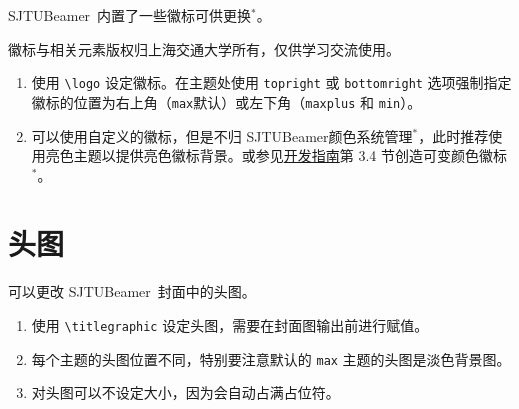 \documentclass[
    UTF8,
    heading=true,
    12pt,
    a4paper
]{ctexrep}
\newenvironment{commentlist}{\begin{enumerate}\small}{\end{enumerate}}
\def\themename{\textsf{SJTUBeamer}}
\begin{document}
\themename\ 内置了一些徽标可供更换$^*$。

\faInfoCircle 徽标与相关元素版权归上海交通大学所有，仅供学习交流使用。

\begin{tcbitemize}[raster rows=2, raster columns=3, raster every box/.style={center title, valign=center, halign=center,fonttitle=\ttfamily,colback=white}]
  \tcbitem[raster multicolumn=2,blankest]
  \begin{tcbitemize}[raster columns=2]
    \tcbitem[title={\textbackslash{}cnlogo}] \moveleft 0.3cm\hbox{\resizebox{!}{1cm}{\cnlogo}}
    \tcbitem[title={\textbackslash{}enlogo}] \moveleft 0.3cm\hbox{\resizebox{!}{1cm}{\enlogo}}
    \tcbitem[title={\textbackslash{}sjtubadge},height=3.5cm] \resizebox{!}{2cm}{\sjtubadge\ }
    \tcbitem[title={\textbackslash{}dlogo},height=3.5cm] \resizebox{3cm}{!}{\dlogo\ }
  \end{tcbitemize}
  \tcbitem[title={\textbackslash{}vlogo}] \resizebox{!}{4.8cm}{\vlogo\ }
\end{tcbitemize}


\begin{commentlist}
  \item 使用 \texttt{\textbackslash{}logo} 设定徽标。在主题处使用 \verb"topright" 或 \verb"bottomright" 选项强制指定徽标的位置为右上角（\verb"max"默认）或左下角（\verb"maxplus" 和 \verb"min"）。
  \item 可以使用自定义的徽标，但是不归 \themename 颜色系统管理$^*$，此时推荐使用亮色主题以提供亮色徽标背景。或参见\href{run:sjtubeamerdevguide.pdf}{开发指南}第 3.4 节创造可变颜色徽标$^*$。
\end{commentlist}

\chapter{头图}

可以更改 \themename\ 封面中的头图。


\begin{commentlist}
  \item 使用 \texttt{\textbackslash{}titlegraphic} 设定头图，需要在封面图输出前进行赋值。
  \item 每个主题的头图位置不同，特别要注意默认的 \texttt{max} 主题的头图是淡色背景图。
  \item 对头图可以不设定大小，因为会自动占满占位符。
\end{commentlist}
\end{document}
